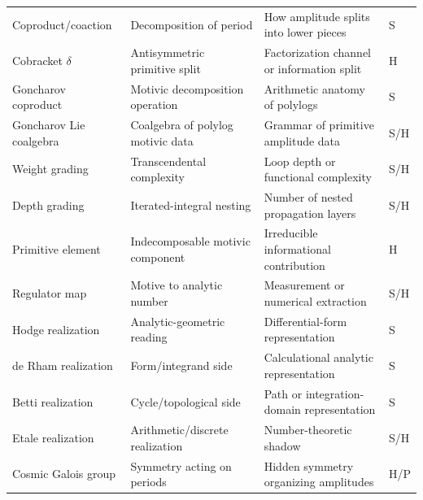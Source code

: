 \documentclass[11pt]{article}
\newcommand{\status}[1]{\textsf{#1}}
\newcommand{\entry}[4]{#1 & #2 & #3 & \status{#4}\\}
\begin{document}
\begin{longtable}{@{}>{\raggedright\arraybackslash}p{}>{\raggedright\arraybackslash}p{}>{\raggedright\arraybackslash}p{}>{\centering\arraybackslash}p{}@{}}
\entry{Coproduct/coaction}{Decomposition of period}{How amplitude splits into lower pieces}{S}
\entry{Cobracket $\delta$}{Antisymmetric primitive split}{Factorization channel or information split}{H}
\entry{Goncharov coproduct}{Motivic decomposition operation}{Arithmetic anatomy of polylogs}{S}
\entry{Goncharov Lie coalgebra}{Coalgebra of polylog motivic data}{Grammar of primitive amplitude data}{S/H}
\entry{Weight grading}{Transcendental complexity}{Loop depth or functional complexity}{S/H}
\entry{Depth grading}{Iterated-integral nesting}{Number of nested propagation layers}{S/H}
\entry{Primitive element}{Indecomposable motivic component}{Irreducible informational contribution}{H}
\entry{Regulator map}{Motive to analytic number}{Measurement or numerical extraction}{S/H}
\entry{Hodge realization}{Analytic-geometric reading}{Differential-form representation}{S}
\entry{de Rham realization}{Form/integrand side}{Calculational analytic representation}{S}
\entry{Betti realization}{Cycle/topological side}{Path or integration-domain representation}{S}
\entry{Etale realization}{Arithmetic/discrete realization}{Number-theoretic shadow}{S/H}
\entry{Cosmic Galois group}{Symmetry acting on periods}{Hidden symmetry organizing amplitudes}{H/P}
\end{longtable}
\end{document}
